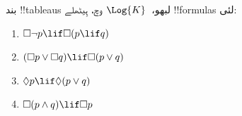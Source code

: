 \documentclass[../../../include/open-logic-section]{subfiles}
\begin{document}
\begin{prob}
  بند !!{tableau}s لبھو،~$\Log{K}$ وچ، ہِیٹھلے !!{formula}s لئی:
  \begin{enumerate}
    \item $\Box \lnot p \lif \Box(p \lif q)$
    \item $(\Box p \lor \Box q) \lif \Box(p \lor q)$
    \item $\Diamond p \lif \Diamond(p \lor q)$
    \item $\Box(p \land q) \lif \Box p$
  \end{enumerate}
\end{prob}
\end{document}
